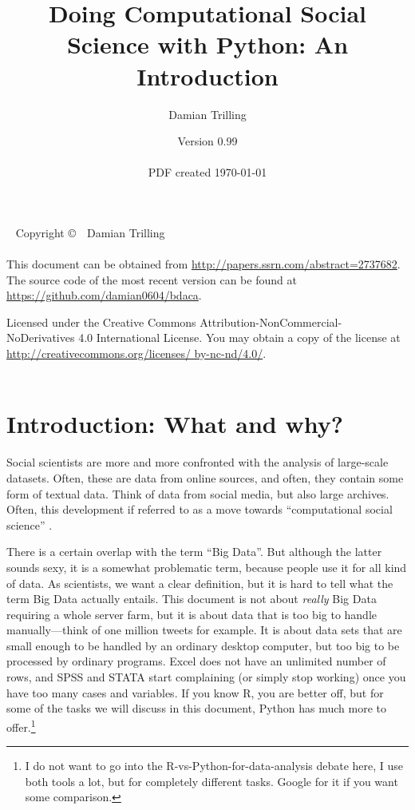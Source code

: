 \documentclass[a4paper,12pt]{book}
\title{Doing Computational Social Science with Python: An Introduction}
\author{Damian Trilling}
\date{Version 0.99\\ ~ \\  \footnotesize{PDF created \today}}
\begin{document}
\frontmatter

\maketitle

\newpage

{~\vfill
\thispagestyle{empty}
\setlength{\parindent}{0pt}
\setlength{\parskip}{\baselineskip}
Copyright \copyright\ \the\year\ Damian Trilling\\
\vspace{.25cm} \\
This document can be obtained from \url{http://papers.ssrn.com/abstract=2737682}. The source code of the most recent version can be found at \url{https://github.com/damian0604/bdaca}.


\par Licensed under the Creative Commons Attribution-NonCommercial-NoDerivatives 4.0 International License. You may obtain a copy of the license at \url{http://creativecommons.org/licenses/ by-nc-nd/4.0/}. \\
\vspace{.5cm} \\
\ccbyncnd

}


\newpage

\tableofcontents


\chapter{Introduction: What and why?}

Social scientists are more and more confronted with the analysis of large-scale datasets. Often, these are data from online sources, and often, they contain some form of textual data. Think of data from social media, but also large archives. Often, this development if referred to as a move towards ``computational social science'' \citep{Lazer2009,Kitchin2014}.

There is a certain overlap with the term ``Big Data''. But although the latter sounds sexy, it is a somewhat problematic term, because people use it for all kind of data. As scientists, we want a clear definition, but it is hard to tell what the term Big Data actually entails. This document is not about \emph{really} Big Data requiring a whole server farm, but it is about data that is too big to handle manually---think of one million tweets for example. It is about data sets that are small enough to be handled by an ordinary desktop computer, but too big to be processed by ordinary programs. Excel does not have an unlimited number of rows, and SPSS and STATA start complaining (or simply stop working) once you have too many cases and variables. If you know R, you are better off, but for some of the tasks we will discuss in this document, Python has much more to offer.\footnote{I do not want to go into the R-vs-Python-for-data-analysis debate here, I use both tools a lot, but for completely different tasks. Google for it if you want some comparison.}  
\end{document}

